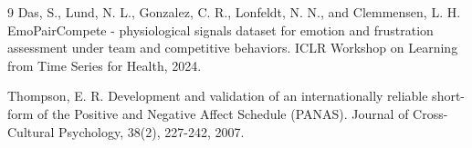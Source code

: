 \documentclass{article}
\begin{document}
\begin{thebibliography}{9}
Das, S., Lund, N. L., Gonzalez, C. R., Lonfeldt, N. N., and Clemmensen, L. H. EmoPairCompete - physiological signals dataset for emotion and frustration assessment under team and competitive behaviors. ICLR Workshop on Learning from Time Series for Health, 2024.

Thompson, E. R. Development and validation of an internationally reliable short-form of the Positive and Negative Affect Schedule (PANAS). Journal of Cross-Cultural Psychology, 38(2), 227-242, 2007.
\end{thebibliography}
\end{document}
